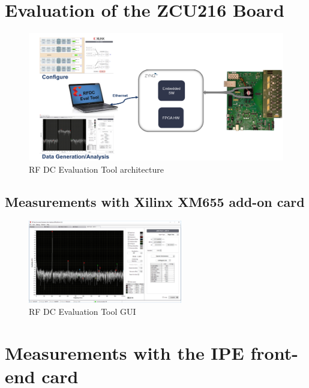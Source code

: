 \section{Evaluation of the ZCU216 Board}

\begin{figure}[H]
	\centering
	\includegraphics[width = \textwidth]{chap/04-characterization/img/zcu216evaltool.png}
	\caption{RF DC Evaluation Tool architecture \cite{zcu216evaltool}}
	\label{fig:zcu216}
\end{figure}


\subsection{Measurements with Xilinx XM655 add-on card}
\begin{figure}[H]
	\centering
	\includegraphics[width = 0.6\textwidth]{chap/04-characterization/img/evaltool.png}
	\caption{RF DC Evaluation Tool GUI \cite{zcu216evaltool}}
	\label{fig:evalTool}
\end{figure}
\section{Measurements with the IPE front-end card}

\newpage
